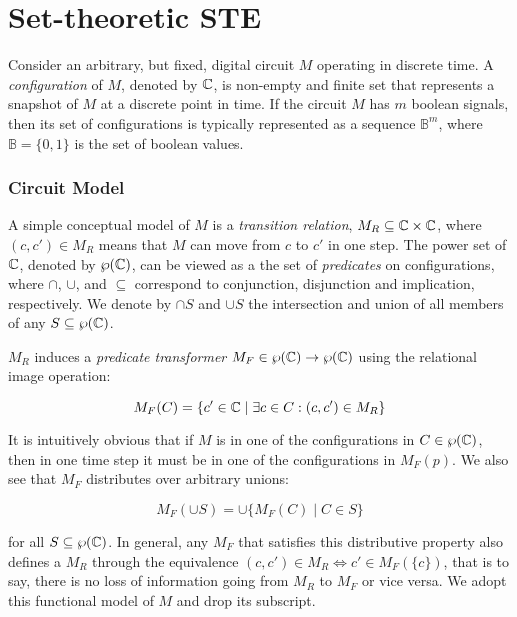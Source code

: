 \section{Set-theoretic STE} \label{sec:set-ste}

Consider an arbitrary, but fixed, digital circuit $M$ operating in discrete time. A \textit{configuration} of $M$, denoted by $\mathbb{C}$, is non-empty and finite set that represents a snapshot of $M$ at a discrete point in time. If the circuit $M$ has $m$ boolean signals, then its set of configurations is typically represented as a sequence $\mathbb{B}^{m}$, where $\mathbb{B} = \{ 0,1 \}$ is the set of boolean values.

\subsubsection{Circuit Model} A simple conceptual model of $M$ is a \textit{transition relation}, $M_{R} \subseteq \mathbb{C} \times \mathbb{C}$, where $(c,c') \in M_{R}$ means that $M$ can move from $c$ to $c'$ in one step\footnotemark. The power set of $\mathbb{C}$, denoted by $\wp(\mathbb{C})$, can be viewed as a the set of \textit{predicates} on configurations, where $\cap$, $\cup$, and $\subseteq$ correspond to conjunction, disjunction and implication, respectively. We denote by $\cap S$ and $\cup S$ the intersection and union of all members of any $S \subseteq \wp(\mathbb{C})$.


$M_{R}$ induces a \textit{predicate transformer} $M_{F} \in \wp(\mathbb{C}) \rightarrow \wp(\mathbb{C})$ using the relational image operation:

\begin{equation*}
M_{F}(C) = \{ c' \in \mathbb{C} \mid \exists c \in C : (c,c') \in M_{R} \}
\end{equation*}

\noindent It is intuitively obvious that if $M$ is in one of the configurations in $C \in \wp(\mathbb{C})$, then in one time step it must be in one of the configurations in $M_{F}(p)$. We also see that $M_{F}$ distributes over arbitrary unions:

\begin{equation*}
M_{F}(\cup S) = \cup \{ M_{F}(C) \mid C \in S \}
\end{equation*}

\noindent for all $S \subseteq \wp(\mathbb{C})$. In general, any $M_{F}$ that satisfies this distributive property also defines a $M_{R}$ through the equivalence $(c,c') \in M_{R} \iff c' \in M_{F}(\{ c \})$, that is to say, there is no loss of information going from $M_{R}$ to $M_{F}$ or vice versa. We adopt this functional model of $M$ and drop its subscript.

